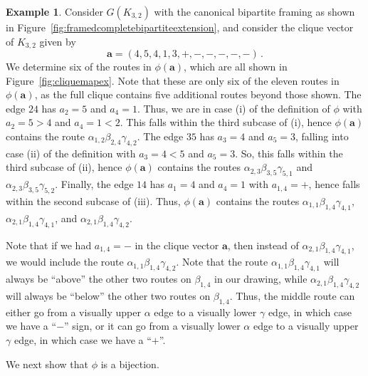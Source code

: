 \documentclass[12pt]{amsart}
\theoremstyle{definition}
\newtheorem{example}[theorem]{Example}
\newcommand\ba{\mathbf{a}}
\begin{document}
\begin{example}\label{ex:cliquemap}
    Consider $G(K_{3,2})$ with the canonical bipartite framing as shown in Figure~\ref{fig:framedcompletebipartiteextension}, and consider the clique vector of $K_{3,2}$ given by
\[
\ba=(4,5,4,1,3,+,-,-,-,-,-) \, .
\]
We determine six of the routes in $\phi(\ba)$, which are all shown in Figure~\ref{fig:cliquemapex}.
Note that these are only six of the eleven routes in $\phi(\ba)$, as the full clique contains five additional routes beyond those shown.
The edge $24$ has $a_2=5$ and $a_4=1$.
Thus, we are in case (i) of the definition of $\phi$ with $a_2=5>4$ and $a_4=1<2$. 
This falls within the third subcase of (i), hence $\phi(\ba)$ contains the route $\alpha_{1,2}\beta_{2,4}\gamma_{4,2}$.
The edge $35$ has $a_3=4$ and $a_5=3$, falling into case (ii) of the definition with $a_3=4<5$ and $a_5=3$.
So, this falls within the third subcase of (ii), hence $\phi(\ba)$ contains the routes $\alpha_{2,3}\beta_{3,5}\gamma_{5,1}$ and $\alpha_{2,3}\beta_{3,5}\gamma_{5,2}$.
Finally, the edge $14$ has $a_1=4$ and $a_4=1$ with $a_{1,4}=+$, hence falls within the second subcase of (iii).
Thus, $\phi(\ba)$ contains the routes $\alpha_{1,1}\beta_{1,4}\gamma_{4,1}$, $\alpha_{2,1}\beta_{1,4}\gamma_{4,1}$, and $\alpha_{2,1}\beta_{1,4}\gamma_{4,2}$.

Note that if we had $a_{1,4}=-$ in the clique vector $\ba$, then instead of $\alpha_{2,1}\beta_{1,4}\gamma_{4,1}$, we would include the route $\alpha_{1,1}\beta_{1,4}\gamma_{4,2}$.
Note that the route $\alpha_{1,1}\beta_{1,4}\gamma_{4,1}$ will always be ``above'' the other two routes on $\beta_{1,4}$ in our drawing, while $\alpha_{2,1}\beta_{1,4}\gamma_{4,2}$ will always be ``below'' the other two routes on $\beta_{1,4}$.
Thus, the middle route can either go from a visually upper $\alpha$ edge to a visually lower $\gamma$ edge, in which case we have a ``$-$'' sign, or it can go from a visually lower $\alpha$ edge to a visually upper $\gamma$ edge, in which case we have a ``$+$''.
\end{example}

We next show that $\phi$ is a bijection.
\end{document}
